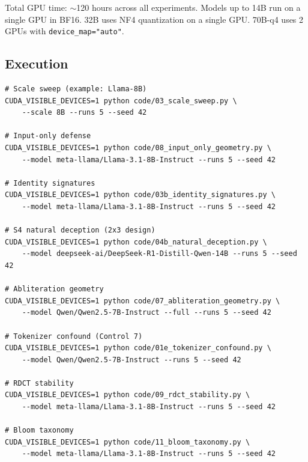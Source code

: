 \documentclass[11pt,a4paper]{article}
\begin{document}
Total GPU time: $\sim$120 hours across all experiments. Models up to 14B run on a single GPU in BF16. 32B uses NF4 quantization on a single GPU. 70B-q4 uses 2 GPUs with \texttt{device\_map="auto"}.

\subsection{Execution}

\begin{verbatim}
# Scale sweep (example: Llama-8B)
CUDA_VISIBLE_DEVICES=1 python code/03_scale_sweep.py \
    --scale 8B --runs 5 --seed 42

# Input-only defense
CUDA_VISIBLE_DEVICES=1 python code/08_input_only_geometry.py \
    --model meta-llama/Llama-3.1-8B-Instruct --runs 5 --seed 42

# Identity signatures
CUDA_VISIBLE_DEVICES=1 python code/03b_identity_signatures.py \
    --model meta-llama/Llama-3.1-8B-Instruct --runs 5 --seed 42

# S4 natural deception (2x3 design)
CUDA_VISIBLE_DEVICES=1 python code/04b_natural_deception.py \
    --model deepseek-ai/DeepSeek-R1-Distill-Qwen-14B --runs 5 --seed 42

# Abliteration geometry
CUDA_VISIBLE_DEVICES=1 python code/07_abliteration_geometry.py \
    --model Qwen/Qwen2.5-7B-Instruct --full --runs 5 --seed 42

# Tokenizer confound (Control 7)
CUDA_VISIBLE_DEVICES=1 python code/01e_tokenizer_confound.py \
    --model Qwen/Qwen2.5-7B-Instruct --runs 5 --seed 42

# RDCT stability
CUDA_VISIBLE_DEVICES=1 python code/09_rdct_stability.py \
    --model meta-llama/Llama-3.1-8B-Instruct --runs 5 --seed 42

# Bloom taxonomy
CUDA_VISIBLE_DEVICES=1 python code/11_bloom_taxonomy.py \
    --model meta-llama/Llama-3.1-8B-Instruct --runs 5 --seed 42
\end{verbatim}
\end{document}

